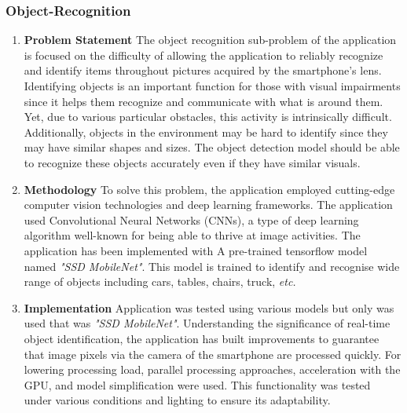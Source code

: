 \documentclass[MScCS]{uccthesis}
\begin{document}
\subsubsection{Object-Recognition}
\begin{enumerate}
    \item \textbf{Problem Statement}
    The object recognition sub-problem of the application is focused on the difficulty of allowing the application to reliably recognize and identify items throughout pictures acquired by the smartphone's lens. Identifying objects is an important function for those with visual impairments since it helps them recognize and communicate with what is around them. Yet, due to various particular obstacles, this activity is intrinsically difficult.
    Additionally, objects in the environment may be hard to identify since they may have similar shapes and sizes. The object detection model should be able to recognize these objects accurately even if they have similar visuals.
    \item \textbf{Methodology}
    To solve this problem, the application employed cutting-edge computer vision technologies and deep learning frameworks. The application used Convolutional Neural Networks (CNNs), a type of deep learning algorithm well-known for being able to thrive at image activities.
    The application has been implemented with A pre-trained tensorflow model named \textit{"SSD MobileNet"}. This model is trained to identify and recognise wide range of objects including cars, tables, chairs, truck, \textit{etc.}
    \item \textbf{Implementation}
    Application was tested using various models but only was used that was \textit{"SSD MobileNet"}. Understanding the significance of real-time object identification, the application has built improvements to guarantee that image pixels via the camera of the smartphone are processed quickly. For lowering processing load, parallel processing approaches, acceleration with the GPU, and model simplification were used. This functionality was tested under various conditions and lighting to ensure its adaptability.

\end{enumerate}
\end{document}
